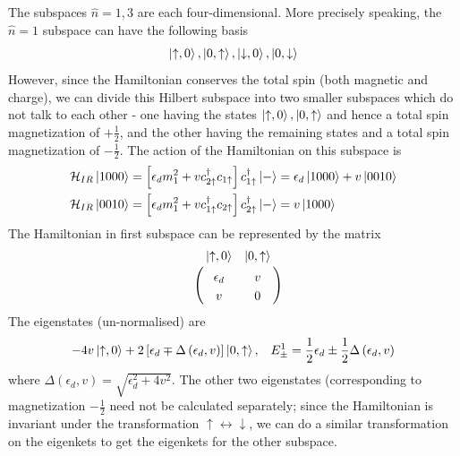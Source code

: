 \documentclass[twoside,11pt]{report}
\numberwithin{equation}{section}
\begin{document}
\\\\The subspaces \(\hat n = 1,3\) are each four-dimensional. More precisely speaking, the \(\hat n=1\) subspace can have the following basis
\begin{equation}\begin{aligned}
	\ket{\uparrow,0}, \ket{0,\uparrow}, \ket{\downarrow,0}, \ket{0,\downarrow}
\end{aligned}\end{equation}
However, since the Hamiltonian conserves the total spin (both magnetic and charge), we can divide this Hilbert subspace into two smaller subspaces which do not talk to each other - one having the states \(\ket{\uparrow,0}, \ket{0,\uparrow}\) and hence a total spin magnetization of \(+\frac{1}{2}\), and the other having the remaining states and a total spin magnetization of \(-\frac{1}{2}\). The action of the Hamiltonian on this subspace is
\begin{equation}\begin{aligned}
	\mathcal{H}_{IR} \ket{1000} &= \left[\epsilon_d m_1^2 + vc^\dagger_{2 \uparrow}c_{1 \uparrow}\right] c^\dagger_{1 \uparrow}\ket{-} = \epsilon_d\ket{1000} + v\ket{0010}\\
	\mathcal{H}_{IR} \ket{0010} &= \left[\epsilon_d m_1^2 + vc^\dagger_{1 \uparrow}c_{2 \uparrow}\right] c^\dagger_{2 \uparrow}\ket{-} = v\ket{1000}\\
\end{aligned}\end{equation}
The Hamiltonian in first subspace can be represented by the matrix
\begin{equation}\begin{aligned}
	\label{n1mat}
	\bordermatrix{~&\ket{\uparrow,0} & \ket{0,\uparrow} \\
		~&\epsilon_d & v \\
		~& v & 0 \\
	}
\end{aligned}\end{equation}
The eigenstates (un-normalised) are
\begin{equation}\begin{aligned}
\label{low}
	-4v\ket{\uparrow,0} +2 \left[ \epsilon_d \mp \Delta\left(\epsilon_d , v\right)\right] \ket{0, \uparrow}, && E^1_\pm = \frac{1}{2} \epsilon_d \pm \frac{1}{2}\Delta\left(\epsilon_d , v\right)
\end{aligned}\end{equation}
where \(\Delta\left(\epsilon_d , v\right)  = \sqrt{\epsilon_d^2 + 4 v^2}\). The other two eigenstates (corresponding to magnetization \(- \frac{1}{2}\) need not be calculated separately; since the Hamiltonian is invariant under the transformation \( \uparrow \leftrightarrow \downarrow\), we can do a similar transformation on the eigenkets to get the eigenkets for the other subspace.
\end{document}
